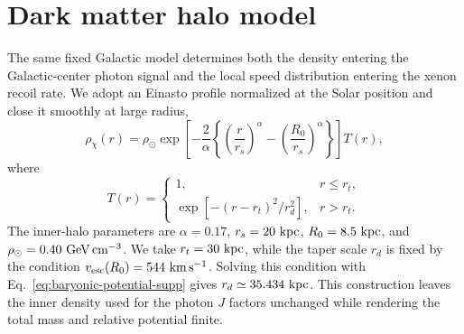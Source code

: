 \documentclass[%
  aps,
  prl,
  reprint,
  superscriptaddress,
  amsmath,
  amssymb,
  longbibliography
]{revtex4-2}
\begin{document}
\section{Dark matter halo model}
\label{sec:lz-reconstruction-supp}


The same fixed Galactic model determines both the density entering the
Galactic-center photon signal and the local speed distribution entering the
xenon recoil rate.  We adopt an Einasto profile normalized at the Solar
position and close it smoothly at large radius,
\begin{equation}
 \rho_\chi(r)=\rho_\odot
 \exp\!\left[-\frac{2}{\alpha}
 \left\{\left(\frac{r}{r_s}\right)^\alpha-
 \left(\frac{R_0}{r_s}\right)^\alpha\right\}\right]T(r),
 \label{eq:einasto-profile-supp}
\end{equation}
where
\begin{equation}
 T(r)=
 \begin{cases}
  1, & r\leq r_t,\\[2pt]
  \exp\!\left[-(r-r_t)^2/r_d^2\right], & r>r_t .
 \end{cases}
 \label{eq:halo-taper-supp}
\end{equation}
The inner-halo parameters are
\(\alpha=0.17\), \(r_s=20~{\rm kpc}\),
\({R_0=8.5~{\rm kpc}}\), and
\({\rho_\odot=0.40~{\rm GeV\,cm^{-3}}}\).  We take
\(r_t=30~{\rm kpc}\), while the taper scale \(r_d\) is fixed by the
condition \(v_{\rm esc}(R_0)=544~{\rm km\,s^{-1}}\).  Solving this condition
with Eq.~\eqref{eq:baryonic-potential-supp} gives
\({r_d\simeq35.434~{\rm kpc}}\).  This construction
leaves the inner density used for the photon \(J\) factors unchanged while
rendering the total mass and relative potential finite.
\end{document}
